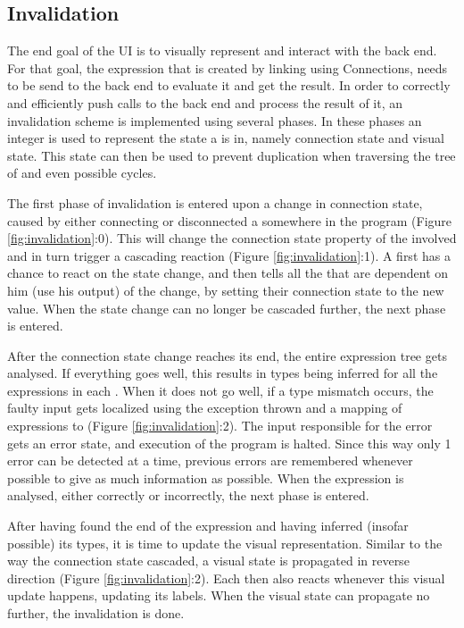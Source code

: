\subsection{Invalidation}
The end goal of the UI is to visually represent and interact with the back end. For that goal, the expression that is created by linking  using Connections, needs to be send to the back end to evaluate it and get the result. In order to correctly and efficiently push calls to the back end and process the result of it, an invalidation scheme is implemented using several phases. In these phases an integer is used to represent the state a  is in, namely connection state and visual state. This state can then be used to prevent duplication when traversing the tree of  and even possible cycles.

The first phase of invalidation is entered upon a change in connection state, caused by either connecting or disconnected a  somewhere in the program (Figure \ref{fig:invalidation}:0). This will change the connection state property of the  involved and in turn trigger a cascading reaction (Figure \ref{fig:invalidation}:1). A  first has a chance to react on the state change, and then tells all the  that are dependent on him (use his output) of the change, by setting their connection state to the new value. When the state change can no longer be cascaded further, the next phase is entered.

After the connection state change reaches its end, the entire expression tree gets analysed. If everything goes well, this results in types being inferred for all the expressions in each . When it does not go well, if a type mismatch occurs, the faulty input gets localized using the exception thrown and a mapping of expressions to  (Figure \ref{fig:invalidation}:2). The input responsible for the error gets an error state, and execution of the program is halted. Since this way only 1 error can be detected at a time, previous errors are remembered whenever possible to give as much information as possible. When the expression is analysed, either correctly or incorrectly, the next phase is entered.

After having found the end of the expression and having inferred (insofar possible) its types, it is time to update the visual representation. Similar to the way the connection state cascaded, a visual state is propagated in reverse direction (Figure \ref{fig:invalidation}:2). Each  then also reacts whenever this visual update happens, updating its labels. When the visual state can propagate no further, the invalidation is done.

